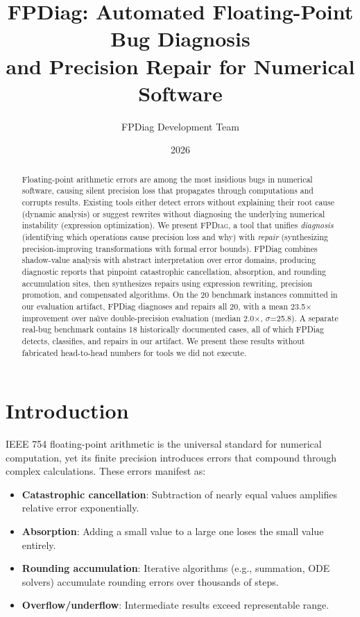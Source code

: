 \documentclass[11pt]{article}
\title{FPDiag: Automated Floating-Point Bug Diagnosis\\and Precision Repair for Numerical Software}
\author{FPDiag Development Team}
\date{2026}
\begin{document}
\maketitle

\begin{abstract}
Floating-point arithmetic errors are among the most insidious bugs in numerical software, causing silent precision loss that propagates through computations and corrupts results. Existing tools either detect errors without explaining their root cause (dynamic analysis) or suggest rewrites without diagnosing the underlying numerical instability (expression optimization). We present \textsc{FPDiag}, a tool that unifies \emph{diagnosis} (identifying which operations cause precision loss and why) with \emph{repair} (synthesizing precision-improving transformations with formal error bounds). FPDiag combines shadow-value analysis with abstract interpretation over error domains, producing diagnostic reports that pinpoint catastrophic cancellation, absorption, and rounding accumulation sites, then synthesizes repairs using expression rewriting, precision promotion, and compensated algorithms. On the 20 benchmark instances committed in our evaluation artifact, FPDiag diagnoses and repairs all 20, with a mean 23.5$\times$ improvement over na\"{\i}ve double-precision evaluation (median 2.0$\times$, $\sigma$=25.8). A separate real-bug benchmark contains 18 historically documented cases, all of which FPDiag detects, classifies, and repairs in our artifact. We present these results without fabricated head-to-head numbers for tools we did not execute.
\end{abstract}

\section{Introduction}
\label{sec:intro}

IEEE 754 floating-point arithmetic is the universal standard for numerical computation, yet its finite precision introduces errors that compound through complex calculations. These errors manifest as:

\begin{itemize}[leftmargin=*]
\item \textbf{Catastrophic cancellation}: Subtraction of nearly equal values amplifies relative error exponentially.
\item \textbf{Absorption}: Adding a small value to a large one loses the small value entirely.
\item \textbf{Rounding accumulation}: Iterative algorithms (e.g., summation, ODE solvers) accumulate rounding errors over thousands of steps.
\item \textbf{Overflow/underflow}: Intermediate results exceed representable range.
\end{itemize}
\end{document}
